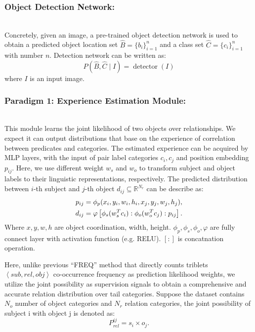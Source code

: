 \documentclass[runningheads]{llncs}
\begin{document}
\subsubsection{Object Detection Network:}~\\
Concretely, given an image, a pre-trained object detection network is used to
obtain a predicted object location set $\hat{{B}}= \lbrace
  b_{i}\rbrace^{n}_{i=1}$ and a class set $\hat{{C}}= \lbrace
  c_{i}\rbrace^{n}_{i=1}$ with number $n$.  Detection network can be written as:
\begin{equation}
  P(\hat{B},\hat{C}\mid I)=\operatorname{detector}(I)
\end{equation}
where $I$ is an input image.
\subsubsection{Paradigm 1: Experience Estimation Module:}~\\
This module learns the joint likelihood of two objects over relationships. We
expect it can output distributions that base on the experience of correlation
between predicates and categories. The estimated experience can be acquired by
MLP layers, with the input of pair label categories $c_{i}, c_{j}$ and position
embedding $p_{ij}$. Here, we use different weight $w_{s}$ and $w_{o}$ to
transform subject and object labels to their linguistic representations,
respectively. The predicted distribution between $i$-th subject and $j$-th
object $d_{ij}\subseteq\mathbb{R}^{N_{r}}$ can be describe as:
\begin{align}
  \centering
  p_{ij} & =\phi_{p}(x_{i},y_{i},w_{i},h_{i},x_{j},y_{j},w_{j},h_{j})\label{pos
  encoding},                                                                    \\
  d_{ij} & =\varphi\left[\phi_{s}(w^{T}_{s}c_{i}):
  \phi_{o}(w^{T}_{o}c_{j}):p_{ij}\right]\label{est}.
\end{align}
Where $x,y,w,h$ are object coordination, width, height.
$\phi_{p},\phi_{s},\phi_{o},\varphi$ are fully connect layer with activation
function (e.g. RELU). $[:]$ is concatnation operation.

Here, unlike previous ``FREQ''\cite{motif} method that directly counts triblets
$\left\langle sub,rel,obj \right\rangle$ co-occurrence frequency as prediction
likelihood weights, we utilize the joint possibility as supervision signals to
obtain a comprehensive and accurate relation distribution over tail categories.
Suppose the dataset contains $N_{o}$ number of object categories and  $N_{r}$
relation categories, the joint possibility of subject i with object j is
denoted as:
\begin{equation}
  P_{rel}^{ij} =s_{i}\times o_{j}.
\end{equation}
\end{document}
